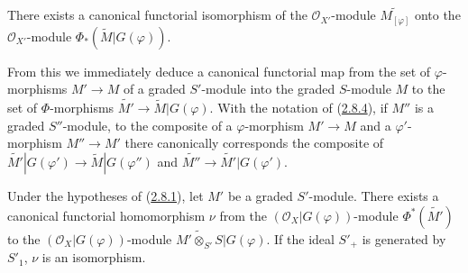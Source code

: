 \begin{proposition}[2.8.7]
\label{II.2.8.7}
There exists a canonical functorial isomorphism of the
$\mathcal{O}_{X'}$-module $\widetilde{M_{[\varphi]}}$ onto the
$\mathcal{O}_{X'}$-module $\Phi_*(\widetilde{M}|G(\varphi))$.
\end{proposition}

From this we immediately deduce a canonical functorial map from the set of
$\varphi$-morphisms $M'\to M$ of a graded $S'$-module into the graded
$S$-module $M$ to the set of $\Phi$-morphisms
$\widetilde{M'}\to\widetilde{M}|G(\varphi)$. With the notation of
(\hyperref[II.2.8.4]{2.8.4}), if $M''$ is a graded $S''$-module, to the
composite of a $\varphi$-morphism $M'\to M$ and a $\varphi'$-morphism
$M''\to M'$ there canonically corresponds the composite of
$\widetilde{M'}|G(\varphi')\to\widetilde{M}|G(\varphi'')$ and
$\widetilde{M''}\to\widetilde{M'}|G(\varphi')$.

\begin{proposition}[2.8.8]
\label{II.2.8.8}
Under the hypotheses of (\hyperref[II.2.8.1]{2.8.1}), let $M'$ be a graded
$S'$-module. There exists a canonical functorial homomorphism $\nu$ from the
$(\mathcal{O}_X|G(\varphi))$-module $\Phi^*(\widetilde{M'})$ to the
$(\mathcal{O}_X|G(\varphi))$-module
$\widetilde{M'\otimes_{S'}S}|G(\varphi)$. If the ideal $S'_+$
is generated by $S'_1$, $\nu$ is an isomorphism.
\end{proposition}

